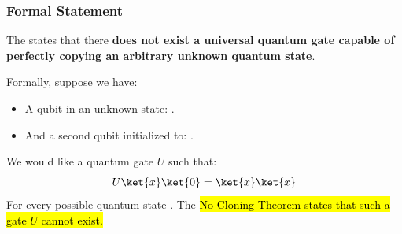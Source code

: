 \subsubsection{Formal Statement}\label{sec:no-cloning-formal-statement}

\begin{definitionbox}
    The  states that there \textbf{does not exist a universal quantum gate capable of perfectly copying an arbitrary unknown quantum state}.

    \highspace
    Formally, suppose we have:
    \begin{itemize}
        \item A qubit in an unknown state: .
        \item And a second qubit initialized to: .
    \end{itemize}
    We would like a quantum gate $U$ such that:
    \begin{equation}
        U \ket{x} \ket{0} = \ket{x} \ket{x}
    \end{equation}
    For every possible quantum state . The \hl{No-Cloning Theorem states that such a gate $U$ cannot exist.}
\end{definitionbox}

